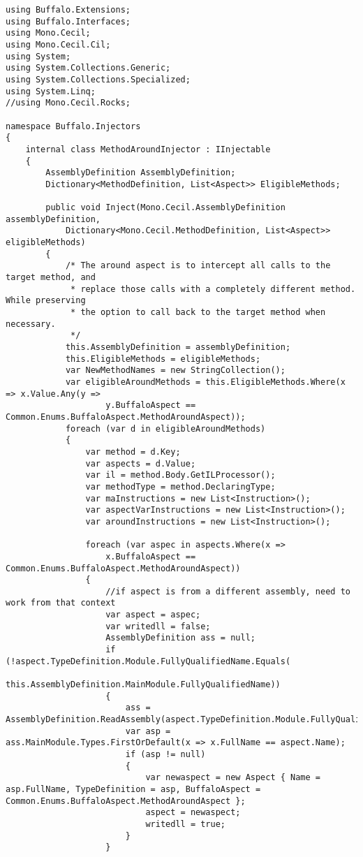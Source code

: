 \begin{lstlisting}[caption={../buffalo/Injectors/MethodAroundInjector.cs}, label=../buffalo/Injectors/MethodAroundInjector.cs, frame=tb, basicstyle=\scriptsize]﻿using Buffalo.Extensions;
using Buffalo.Interfaces;
using Mono.Cecil;
using Mono.Cecil.Cil;
using System;
using System.Collections.Generic;
using System.Collections.Specialized;
using System.Linq;
//using Mono.Cecil.Rocks;

namespace Buffalo.Injectors
{
    internal class MethodAroundInjector : IInjectable
    {
        AssemblyDefinition AssemblyDefinition;
        Dictionary<MethodDefinition, List<Aspect>> EligibleMethods;

        public void Inject(Mono.Cecil.AssemblyDefinition assemblyDefinition, 
            Dictionary<Mono.Cecil.MethodDefinition, List<Aspect>> eligibleMethods)
        {
            /* The around aspect is to intercept all calls to the target method, and
             * replace those calls with a completely different method. While preserving
             * the option to call back to the target method when necessary.
             */
            this.AssemblyDefinition = assemblyDefinition;
            this.EligibleMethods = eligibleMethods;
            var NewMethodNames = new StringCollection();
            var eligibleAroundMethods = this.EligibleMethods.Where(x => x.Value.Any(y => 
                    y.BuffaloAspect == Common.Enums.BuffaloAspect.MethodAroundAspect));
            foreach (var d in eligibleAroundMethods)
            {
                var method = d.Key;
                var aspects = d.Value;
                var il = method.Body.GetILProcessor();
                var methodType = method.DeclaringType;
                var maInstructions = new List<Instruction>();
                var aspectVarInstructions = new List<Instruction>();
                var aroundInstructions = new List<Instruction>();

                foreach (var aspec in aspects.Where(x => 
                    x.BuffaloAspect == Common.Enums.BuffaloAspect.MethodAroundAspect))
                {
                    //if aspect is from a different assembly, need to work from that context
                    var aspect = aspec;
                    var writedll = false;
                    AssemblyDefinition ass = null;
                    if (!aspect.TypeDefinition.Module.FullyQualifiedName.Equals(
                        this.AssemblyDefinition.MainModule.FullyQualifiedName))
                    {
                        ass = AssemblyDefinition.ReadAssembly(aspect.TypeDefinition.Module.FullyQualifiedName);
                        var asp = ass.MainModule.Types.FirstOrDefault(x => x.FullName == aspect.Name);
                        if (asp != null)
                        {
                            var newaspect = new Aspect { Name = asp.FullName, TypeDefinition = asp, BuffaloAspect = Common.Enums.BuffaloAspect.MethodAroundAspect };
                            aspect = newaspect;
                            writedll = true;
                        }
                    }


\end{lstlisting}
